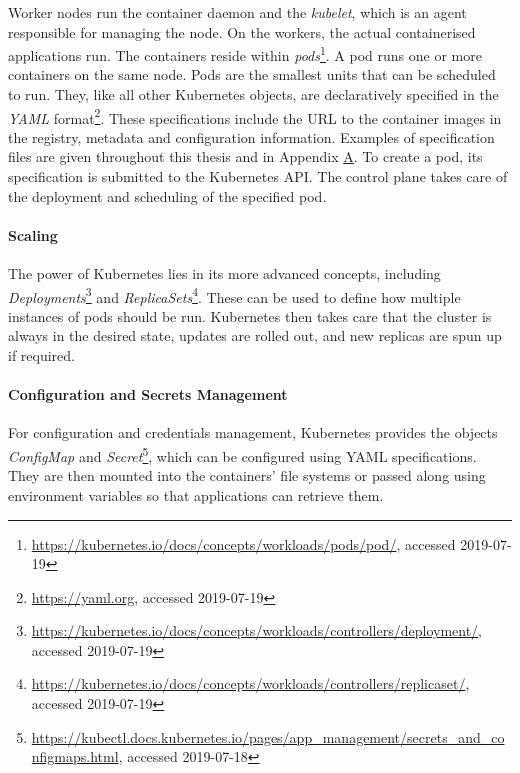 Worker nodes run the container daemon and the \textit{kubelet}, which is an agent responsible for managing the node. On the workers, the actual containerised applications run. The containers reside within \textit{pods}\footnote{\url{https://kubernetes.io/docs/concepts/workloads/pods/pod/}, accessed 2019-07-19}. A pod runs one or more containers on the same node. Pods are the smallest units that can be scheduled to run. They, like all other Kubernetes objects, are declaratively specified in the \textit{YAML} format\footnote{\url{https://yaml.org}, accessed 2019-07-19}. These specifications include the URL to the container images in the registry, metadata and configuration information. Examples of specification files are given throughout this thesis and in Appendix \hyperref[apx:A]{A}. To create a pod, its specification is submitted to the Kubernetes API. The control plane takes care of the deployment and scheduling of the specified pod. 

\paragraph{Scaling}

The power of Kubernetes lies in its more advanced concepts, including \textit{Deployments}\footnote{\url{https://kubernetes.io/docs/concepts/workloads/controllers/deployment/}, \\ accessed 2019-07-19} and \textit{ReplicaSets}\footnote{\url{https://kubernetes.io/docs/concepts/workloads/controllers/replicaset/}, \\ accessed 2019-07-19}. These can be used to define how multiple instances of pods should be run. Kubernetes then takes care that the cluster is always in the desired state, updates are rolled out, and new replicas are spun up if required.

\paragraph{Configuration and Secrets Management}

For configuration and credentials management, Kubernetes provides the objects \textit{ConfigMap} and \textit{Secret}\footnote{\url{https://kubectl.docs.kubernetes.io/pages/app_management/secrets_and_configmaps.html}, accessed 2019-07-18}, which can be configured using YAML specifications. They are then mounted into the containers' file systems or passed along using environment variables so that applications can retrieve them.

